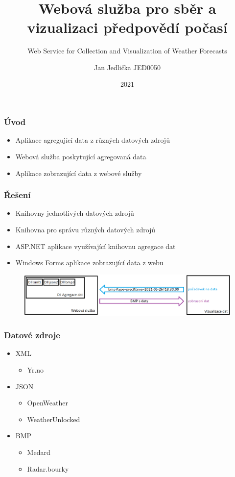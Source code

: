 \documentclass{beamer}
\title{Webová služba pro sběr a vizualizaci předpovědí počasí}
\subtitle{Web Service for Collection and Visualization of Weather Forecasts}
\author{Jan Jedlička JED0050}
\institute{VŠB-TUO}
\date{2021}
\begin{document}
	
	\frame{\titlepage}
	
	\begin{frame}
		\frametitle{Úvod}
		
		\begin{itemize}
			\item Aplikace agregující data z různých datových zdrojů
			\item Webová služba poskytující agregovaná data
			\item Aplikace zobrazující data z webové služby
		\end{itemize}
		
	\end{frame}

	\begin{frame}
		\frametitle{Řešení}
		
		\begin{itemize}
			\item Knihovny jednotlivých datových zdrojů
			\item Knihovna pro správu různých datových zdrojů
			\item ASP.NET aplikace využívající knihovnu agregace dat
			\item Windows Forms aplikace zobrazující data z webu
		\end{itemize}
		
		\begin{figure}
			
			\includegraphics[scale=0.323]{figures/schema prace.png}

		\end{figure}
		
	\end{frame}

	\begin{frame}
		\frametitle{Datové zdroje}
		
		\begin{itemize}
			\item XML
			\begin{itemize}
				\item Yr.no
			\end{itemize}
			\item JSON
			\begin{itemize}
				\item OpenWeather
				\item WeatherUnlocked
			\end{itemize}
			\item BMP
			\begin{itemize}
				\item Medard
				\item Radar.bourky
			\end{itemize}
		\end{itemize}
	\end{frame}
\end{document}
